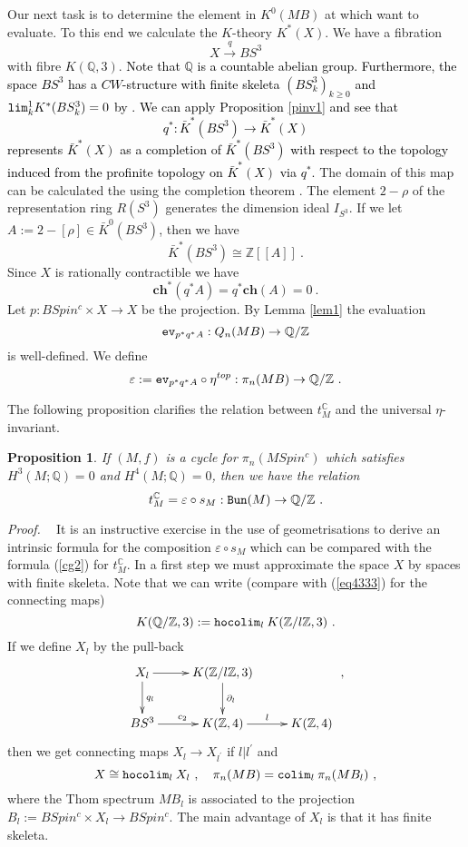 \documentclass[12pt]{article}
\newtheorem{prop}[theorem]{Proposition}
\newcommand{\Bun}{{\tt Bun}}
\newcommand{\hocolim}{{\tt hocolim}}
\newcommand{\ev}{{\tt ev}}
\newcommand{\proof}{{\it Proof.$\:\:\:\:$}}
\newcommand{\Z}{{\mathbb{Z}}}
\newcommand{\Q}{{\mathbb{Q}}}
\newcommand{\C}{{\mathbb{C}}}
\newcommand{\ch}{{\mathbf{ch}}}
\renewcommand{\lim}{{\tt lim}}
\newcommand{\colim}{{\tt colim}}
\begin{document}
Our next task is to determine the element in $K^{0}(MB)$ at which want to evaluate.
To this end we calculate
the $K$-theory  $K^{*}(X)$.
We have a fibration
$$ X\stackrel{q}{\to} BS^{3}$$
with fibre $K(\Q,3)$. \textcolor{black}{Note that  $\Q$ is a countable abelian group.  Furthermore, the space $ BS^{3}$ has a $CW$-structure with 
 finite skeleta $(BS^{3}_{k})_{k\ge 0}$ and $\lim_{k}^{1} K^{*}(BS^{3}_{k})=0$ by  \cite{MR0259946}.
  We can apply  
  Proposition
 \ref{pinv1}  and see  that
\begin{equation}\label{cg15}q^{*}:\bar K^{*}( BS^{3} )\to \bar K^{*}( X)\end{equation}
represents $\bar K^{*}( X)$ as a completion
of $\bar K^{*}(  BS^{3} )$ with respect to the topology induced from the profinite topology on $\bar K^{*}( X)$ via $q^{*}$.}
 The domain of this map can be calculated the using the completion theorem \cite{MR0259946}. 
The element  
$2-\rho$ of the representation ring $R(S^{3})$ generates the dimension ideal $I_{S^{3}}$. If we let
$A:=2-[\rho]\in \bar K^{0}(BS^{3})$, then we have
$$\bar K^{*}(BS^{3})\cong \Z[[A]]\ .$$ 
Since $X$ is rationally contractible we have
$$\ch^{*}(q^{*}A)=q^{*}\ch(A)=0\ .$$
Let  $p:BSpin^{c}\times X\to X$ be the projection.  By Lemma \ref{lem1} the evaluation
$$\ev_{p^{*}q^{*}A}:Q_{n}(MB)\to \Q/\Z$$
is well-defined. We define
$$\varepsilon:= \ev_{p^{*}q^{*}A}\circ \eta^{top}:\pi_{n}(MB)\to \Q/\Z\ .$$

 
The following proposition clarifies the relation between $t_{M}^{\C}$ and the universal $\eta$-invariant.
\begin{prop}\label{cg78}
If $(M,f)$  is a cycle for $\pi_{n}(MSpin^{c})$ which satisfies    
$H^{3}(M;\Q)=0$ and $H^{4}(M;\Q)=0$, then we have the relation
$$t^{\C}_{M}=\varepsilon\circ s_{M}:\Bun(M)\to \Q/\Z\ .$$
\end{prop}
\proof
It is an instructive exercise in the use of geometrisations to
derive an intrinsic formula for the composition $\varepsilon\circ s_{M}$ which can be compared with the formula 
(\ref{cg2}) for $t_{M}^{\C}$. In a first step we must approximate the space $X$ by  spaces with finite skeleta. Note that we can write (compare with (\ref{eq4333}) for the connecting maps)
$$K(\Q/\Z,3):=\hocolim_{l}\: K(\Z/l\Z,3)\ .$$
If we define
$X_{l}$ by the pull-back 
\begin{equation}\label{cg133}\xymatrix{X_{l}\ar[d]^{q_{l}}\ar[r]&K(\Z/l\Z,3)\ar[d]^{\partial_{l}}&\\
BS^{3}\ar[r]^{c_{2}}&K(\Z,4)\ar[r]^{l}&K(\Z,4)}\ ,\end{equation}
then we get connecting maps $X_{l}\to X_{l^{\prime}}$ if $l|l^{\prime}$ and 
$$X\cong \hocolim_{l}\: X_{l}\ ,\quad  \pi_{n}(MB )=\colim_{l}\: \pi_{n}(MB_{l})\ ,$$ where the Thom spectrum $MB_{l}$ is associated to the projection 
$B_{l}:=BSpin^{c}\times X_{l}\to BSpin^{c}$.   The main advantage of $X_{l}$ is that it has finite skeleta. 
\end{document}
